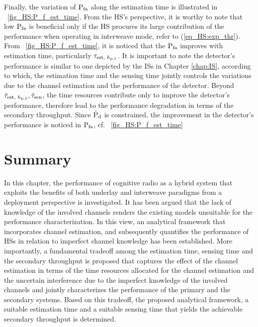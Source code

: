 Finally, the variation of $\text{P}_{\text{fa}}$ along the estimation time is illustrated in \figurename~\ref{fig_HS:P_f_est_time}. From the HS's perspective, it is worthy to note that low $\text{P}_{\text{fa}}$ is beneficial only if the HS procures its large contribution of the performance when operating in interweave mode, refer to (\ref{eq_HS:exp_thr}). From \figurename~\ref{fig_HS:P_f_est_time}, it is noticed that the $\text{P}_{\text{fa}}$ improves with estimation time, particularly $\tau_{\text{est, $h_{\text{p,1}}$}}$. It is important to note the detector's performance is similar to one depicted by the ISs in Chapter \ref{chap:IS}, according to which, the estimation time and the sensing time jointly controls the variations due to the channel estimation and the performance of the detector. Beyond $\tilde{\tau}_{\text{est, $h_{\text{p,1}}$}}, \tilde{\tau}_{\text{sen}}$, the time resources contribute only to improve the detector's performance, therefore lead to the performance degradation in terms of the secondary throughput. Since $\hat{\text{P}}_{\text{d}}$ is constrained, the improvement in the detector's performance is noticed in $\text{P}_{\text{fa}}$, cf. \figurename~\ref{fig_HS:P_f_est_time} 

\section{Summary} \label{sec:conc}
In this chapter, the performance of cognitive radio as a hybrid system that exploits the benefits of both underlay and interweave paradigms from a deployment perspective is investigated. It has been argued that the lack of knowledge of the involved channels renders the existing models unsuitable for the performance characterization. In this view, an analytical framework that incorporates channel estimation, and subsequently quantifies the performance of HSs in relation to imperfect channel knowledge has been established. More importantly, a fundamental tradeoff among the estimation time, sensing time and the secondary throughput is proposed that captures the effect of the channel estimation in terms of the time resources allocated for the channel estimation and the uncertain interference due to the imperfect knowledge of the involved channels and jointly characterizes the performance of the primary and the secondary systems. Based on this tradeoff, the proposed analytical framework, a suitable estimation time and a suitable sensing time that yields the achievable secondary throughput is determined. %

